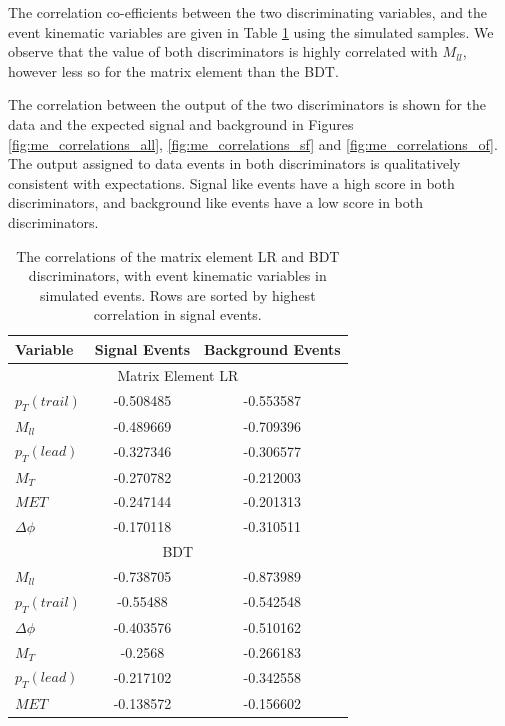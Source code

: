 The correlation co-efficients between the
two discriminating variables, and the event kinematic variables
are given in Table \ref{tab:bdt_me_correlations} using the simulated samples.
We observe that the value of both discriminators is highly
correlated with $M_{ll}$, however less so for the 
matrix element than the BDT.

The correlation between the output of the two discriminators
is shown for the data and the expected signal and background
in Figures \ref{fig:me_correlations_all}, 
\ref{fig:me_correlations_sf} and \ref{fig:me_correlations_of}.
The output assigned to data events in both discriminators
is qualitatively consistent with expectations.
Signal like events have a high score in both discriminators,
and background like events have a low score in both discriminators.

\vspace{30pt}
\begin{table}[ht!]
\begin{center}
\begin{tabular}{l|c|c}
\hline
Variable        &   Signal Events   & Background Events \\ \hline
\hline
\multicolumn{3}{c}{Matrix Element LR} \\
\hline

$p_{T} (trail)$ &   -0.508485       &  -0.553587 \\
$M_{ll}$        &   -0.489669       &  -0.709396 \\
$p_{T} (lead)$  &   -0.327346       &  -0.306577 \\
$M_{T}$         &   -0.270782       &  -0.212003 \\
$MET$           &  -0.247144        &  -0.201313 \\
$\Delta\phi$    &   -0.170118       &  -0.310511  \\
\hline
\multicolumn{3}{c}{BDT} \\
\hline
$M_{ll}$        &  -0.738705       &  -0.873989 \\
$p_{T} (trail)$ &  -0.55488        &  -0.542548 \\
$\Delta\phi$    &  -0.403576       &  -0.510162  \\
$M_{T}$         &  -0.2568         &  -0.266183  \\
$p_{T} (lead)$  &  -0.217102       &  -0.342558 \\
$MET$           &  -0.138572       &  -0.156602 \\
\hline
\end{tabular}
\end{center}
\caption{ The correlations of the matrix element LR and BDT discriminators, with
event kinematic variables in simulated events.  Rows are sorted by highest correlation in signal events. }
\label{tab:bdt_me_correlations}
\end{table}

